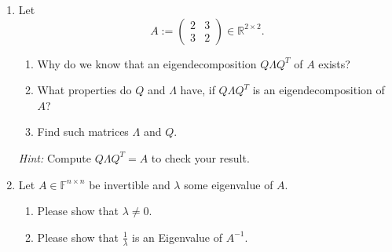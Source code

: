 \begin{enumerate}
	\item Let $$A:=\begin{pmatrix}2&3\\3&2 \end{pmatrix} \in \mathbb{R}^{2\times 2}. $$
	\begin{enumerate}
		\item Why do we know that an eigendecomposition $Q \Lambda Q^T$ of $A$ exists?
		\item What properties do $Q$ and $\Lambda$ have, if $Q \Lambda Q^T$ is an eigendecomposition of $A$?
		\item Find such matrices $\Lambda$ and $Q$.
	\end{enumerate}
	\textit{Hint:} Compute $Q \Lambda Q^T = A$ to check your result.
	\item Let $A \in \mathbb{F}^{n \times n}$ be invertible and $\lambda$ some eigenvalue of $A$.
	\begin{enumerate}
		\item Please show that $\lambda \neq 0$.
		\item Please show that $\frac{1}{\lambda}$ is an Eigenvalue of $A^{-1}$.
	\end{enumerate}
\end{enumerate}
